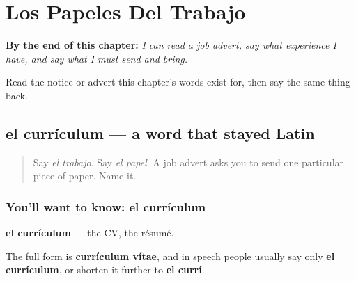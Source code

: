 
\chapter{Los Papeles Del Trabajo}
\label{ch:es-papeles}

\begin{chapteropening}
\textbf{By the end of this chapter:} \emph{I can read a job advert, say what experience I have, and say what I must send and bring.}

Read the notice or advert this chapter's words exist for, then say the same thing back.
\end{chapteropening}

\section[el currículum]{el currículum — a word that stayed Latin}

\label{lesson:ES-C435-curriculum}



\begin{quote}
Say \emph{el trabajo}. Say \emph{el papel}. A job advert asks you to send one particular piece of paper. Name it.
\end{quote}

\subsection*{You'll want to know: el currículum}
\textbf{el currículum} — the CV, the résumé.

The full form is \textbf{currículum vítae}, and in speech people usually say only \textbf{el currículum}, or shorten it further to \textbf{el currí}.

